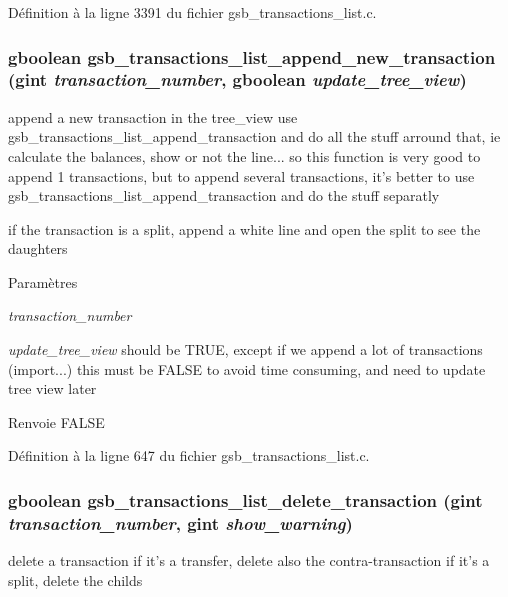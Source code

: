 Définition à la ligne 3391 du fichier gsb\_\-transactions\_\-list.c.

\subsubsection[{gsb\_\-transactions\_\-list\_\-append\_\-new\_\-transaction}]{\setlength{\rightskip}{0pt plus 5cm}gboolean gsb\_\-transactions\_\-list\_\-append\_\-new\_\-transaction (gint {\em transaction\_\-number}, \/  gboolean {\em update\_\-tree\_\-view})}\label{gsb__transactions__list_8c_ab384002f4635a570bc9907b04b3efd24}
append a new transaction in the tree\_\-view use gsb\_\-transactions\_\-list\_\-append\_\-transaction and do all the stuff arround that, ie calculate the balances, show or not the line... so this function is very good to append 1 transactions, but to append several transactions, it's better to use gsb\_\-transactions\_\-list\_\-append\_\-transaction and do the stuff separatly

if the transaction is a split, append a white line and open the split to see the daughters


\begin{DoxyParams}{Paramètres}
\item[{\em transaction\_\-number}]\item[{\em update\_\-tree\_\-view}]should be TRUE, except if we append a lot of transactions (import...) this must be FALSE to avoid time consuming, and need to update tree view later\end{DoxyParams}
\begin{DoxyReturn}{Renvoie}
FALSE 
\end{DoxyReturn}


Définition à la ligne 647 du fichier gsb\_\-transactions\_\-list.c.

\subsubsection[{gsb\_\-transactions\_\-list\_\-delete\_\-transaction}]{\setlength{\rightskip}{0pt plus 5cm}gboolean gsb\_\-transactions\_\-list\_\-delete\_\-transaction (gint {\em transaction\_\-number}, \/  gint {\em show\_\-warning})}\label{gsb__transactions__list_8c_ab0651c16a8ca47b70e7ccdb2d9c18ba1}
delete a transaction if it's a transfer, delete also the contra-\/transaction if it's a split, delete the childs


